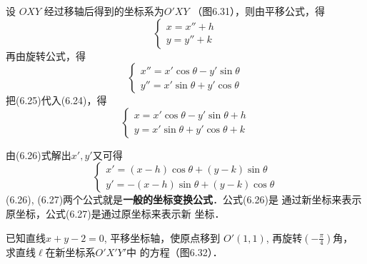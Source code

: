 设 $OXY$ 经过移轴后得到的坐标系为$O'XY$
（图6.31），则由平移公式，得
\begin{equation}
\begin{cases}
    x=x''+h\\
    y=y''+k
\end{cases}
\end{equation}
再由旋转公式，得
\begin{equation}
    \begin{cases}
        x''=x'\cos\theta-y'\sin\theta\\
        y''=x'\sin\theta+y'\cos\theta
    \end{cases}
\end{equation}
把(6.25)代入(6.24)，得
\begin{equation}
    \boxed{\begin{cases}
        x=x'\cos\theta-y'\sin\theta+h\\
        y=x'\sin\theta+y'\cos\theta+k
    \end{cases} } 
\end{equation}

由(6.26)式解出$x',y'$又可得
\begin{equation}
\boxed{\begin{cases}
    x'=(x-h)\cos\theta+(y-k)\sin\theta\\
    y'=-(x-h)\sin\theta+(y-k)\cos\theta
\end{cases} }
\end{equation}
(6.26), (6.27)两个公式就是\textbf{一般的坐标变换公式}．公式(6.26)是
通过新坐标来表示原坐标，公式(6.27)是通过原坐标来表示新
坐标．

\begin{example}
    已知直线$x+y-2=0$, 
平移坐标轴，使原点移到
$O'(1,1)$, 再旋转$\left(-\frac{\pi}{4}\right)$角，
求直线$\ell$在新坐标系$O'X'Y'$中
的方程（图6.32）．
\end{example}

\begin{figure}[htp]
    \centering
{}

    \caption{}
\end{figure}

